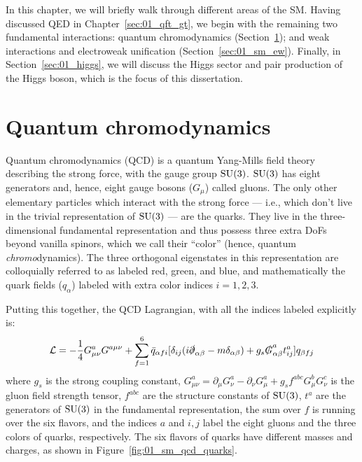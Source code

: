In this chapter, we will briefly walk through different areas of the SM.
Having discussed QED in Chapter~\ref{sec:01_qft_gt}, we begin with the remaining two fundamental interactions: quantum chromodynamics (Section~\ref{sec:01_sm_qcd}); and weak interactions and electroweak unification (Section~\ref{sec:01_sm_ew}).
Finally, in Section~\ref{sec:01_higgs}, we will discuss the Higgs sector and pair production of the Higgs boson, which is the focus of this dissertation.


\section{Quantum chromodynamics}
\label{sec:01_sm_qcd}

Quantum chromodynamics (QCD) is a quantum Yang-Mills field theory describing the strong force, with the gauge group $\SU[3]$.
$\SU[3]$ has eight generators and, hence, eight gauge bosons ($G_\mu$) called gluons.
The only other elementary particles which interact with the strong force --- i.e., which don't live in the trivial representation of $\SU[3]$ --- are the quarks.
They live in the three-dimensional fundamental representation and thus possess three extra DoFs beyond vanilla spinors, which we call their ``color'' (hence, quantum \textit{chromo}dynamics).
The three orthogonal eigenstates in this representation are colloquially referred to as labeled red, green, and blue, and mathematically the quark fields ($q_\alpha$) labeled with extra color indices $i = 1, 2, 3$.

Putting this together, the QCD Lagrangian, with all the indices labeled explicitly is:
\begin{equation}
	\label{eq:01_sm_qcd_lagrangian}
	\mathcal L = -\frac{1}{4} G^a_{\mu\nu} G^{a\mu\nu} + \sum_{f = 1}^6 \bar q_{\alpha f i} [\delta_{ij}(i\slashed \partial_{\alpha\beta} - m \delta_{\alpha\beta}) + g_s \slashed G^a_{\alpha\beta} t_{ij}^a] q_{\beta f j}
\end{equation}
where $g_s$ is the strong coupling constant, $G^a_{\mu\nu} = \partial_\mu G^a_\nu - \partial_\nu G^a_\mu + g_s f^{abc} G^b_\mu G^c_\nu$ is the gluon field strength tensor, $f^{abc}$ are the structure constants of $\SU[3]$, $t^a$ are the generators of $\SU[3]$ in the fundamental representation, the sum over $f$ is running over the six flavors, and the indices $a$ and $i, j$ label the eight gluons and the three colors of quarks, respectively.
The six flavors of quarks have different masses and charges, as shown in Figure~\ref{fig:01_sm_qcd_quarks}.


